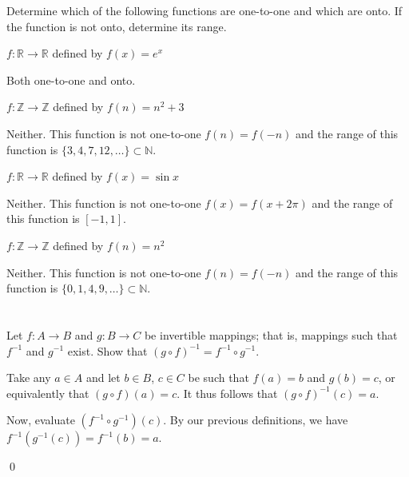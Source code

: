 Determine which of the following functions are one-to-one and which are onto. If the function is not onto, determine its range.
\hr
\begin{exlist}
    \item $f : \mathbb{R} \rightarrow \mathbb{R}$ defined by $f(x) = e^x$

    \medskip

    Both one-to-one and onto.

    \item $f : \mathbb{Z} \rightarrow \mathbb{Z}$ defined by $f(n) = n^2 + 3$

    \medskip

    Neither. This function is not one-to-one \emdash $f(n) = f(-n)$ \emdash and the range of this function is $\{3, 4, 7, 12, \dots\} \subset \mathbb{N}$.

    \item $f : \mathbb{R} \rightarrow \mathbb{R}$ defined by $f(x) = \sin x$

    \medskip

    Neither. This function is not one-to-one \emdash $f(x) = f(x + 2\pi)$ \emdash and the range of this function is $[-1, 1]$.

    \item $f : \mathbb{Z} \rightarrow \mathbb{Z}$ defined by $f(n) = n^2$

    \medskip

    Neither. This function is not one-to-one \emdash $f(n) = f(-n)$ \emdash and the range of this function is $\{0, 1, 4, 9, \dots\} \subset \mathbb{N}$.
\end{exlist}
\pagebreak
\section{}\label{sec:1-19}

Let $f: A \rightarrow B$ and $g: B \rightarrow C$ be invertible mappings; that is, mappings such that $f^{-1}$ and $g^{-1}$ exist.
Show that $(g \circ f)^{-1} = f^{-1} \circ g^{-1}$.
\hr

Take any $a \in A$ and let $b \in B$, $c \in C$ be such that $f(a) = b$ and $g(b) = c$, or equivalently that $(g \circ f)(a) = c$. It thus follows that $(g \circ f)^{-1}(c) = a.$

Now, evaluate $(f^{-1} \circ g^{-1})(c)$. By our previous definitions, we have $f^{-1}(g^{-1}(c)) = f^{-1}(b) = a$.

\qed

\section{}\label{sec:1-20}

